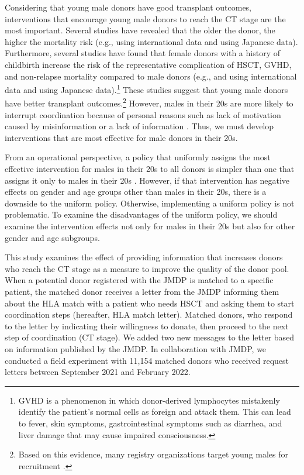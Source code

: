 \documentclass[12pt, a4paper]{article}
\begin{document}
Considering that young male donors have good transplant outcomes, interventions that encourage young male donors to reach the CT stage are the most important. Several studies have revealed that the older the donor, the higher the mortality risk (e.g., \citet{Kollman2016} using international data and \citet{Arai2016} using Japanese data). Furthermore, several studies have found that female donors with a history of childbirth increase the risk of the representative complication of HSCT, GVHD, and non-relapse mortality compared to male donors (e.g., \citet{Loren2006} and \citet{Kollman2016} using international data and \citet{Shinohara2017} using Japanese data).\footnote{GVHD is a phenomenon in which donor-derived lymphocytes mistakenly identify the patient's normal cells as foreign and attack them. This can lead to fever, skin symptoms, gastrointestinal symptoms such as diarrhea, and liver damage that may cause impaired consciousness.} These studies suggest that young male donors have better transplant outcomes.\footnote{Based on this evidence, many registry organizations target young males for recruitment \citep{Fingrut2018}.} However, males in their 20s are more likely to interrupt coordination because of personal reasons such as lack of motivation caused by misinformation or a lack of information \citep{Hirakawa2018, Kurosawa2022}. Thus, we must develop interventions that are most effective for male donors in their 20s.

From an operational perspective, a policy that uniformly assigns the most effective intervention for males in their 20s to all donors is simpler than one that assigns it only to males in their 20s . However, if that intervention has negative effects on gender and age groups other than males in their 20s, there is a downside to the uniform policy. Otherwise, implementing a uniform policy is not problematic. To examine the disadvantages of the uniform policy, we should examine the intervention effects not only for males in their 20s but also for other gender and age subgroups.

This study examines the effect of providing information that increases donors who reach the CT stage as a measure to improve the quality of the donor pool. When a potential donor registered with the JMDP is matched to a specific patient, the matched donor receives a letter from the JMDP informing them about the HLA match with a patient who needs HSCT and asking them to start coordination steps (hereafter, HLA match letter). Matched donors, who respond to the letter by indicating their willingness to donate, then proceed to the next step of coordination (CT stage). We added two new messages to the letter based on information published by the JMDP. In collaboration with JMDP, we conducted a field experiment with 11,154 matched donors who received request letters between September 2021 and February 2022.
\end{document}
